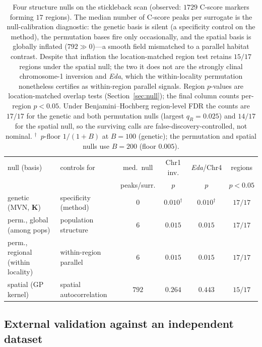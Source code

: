 \documentclass[11pt]{article}
\begin{document}
\begin{table}[h]
  \centering
  \small
  \begin{tabular}{llcccc}
    \hline
    null (basis) & controls for & med.\ null & Chr1 inv. & \textit{Eda}/Chr4 & regions \\
                 &              & peaks/surr. & $p$ & $p$ & $p<0.05$ \\
    \hline
    genetic (MVN, $\mathbf{K}$)        & specificity (method)     & $0$   & $0.010^{\dagger}$ & $0.010^{\dagger}$ & $17/17$ \\
    perm., global (among pops)         & population structure     & $6$   & $0.015$           & $0.015$           & $17/17$ \\
    perm., regional (within locality)  & within-region parallel   & $6$   & $0.015$           & $0.015$           & $17/17$ \\
    spatial (GP kernel)                & spatial autocorrelation  & $792$ & $0.264$           & $0.443$           & $15/17$ \\
    \hline
  \end{tabular}
  \caption{Four structure nulls on the stickleback scan (observed: $1729$ C-score
  markers forming $17$ regions). The median number of C-score peaks per surrogate is
  the null-calibration diagnostic: the genetic basis is silent (a specificity
  control on the method), the permutation bases fire only occasionally, and the
  spatial basis is globally inflated ($792 \gg 0$)---a smooth field mismatched to a
  parallel habitat contrast. Despite that inflation the location-matched region test
  retains $15/17$ regions under the spatial null; the two it does not are the
  strongly clinal chromosome-1 inversion and \textit{Eda}, which the within-locality
  permutation nonetheless certifies as within-region parallel signals. Region
  $p$-values are location-matched overlap tests (Section~\ref{sec:null}); the final
  column counts per-region $p < 0.05$. Under Benjamini--Hochberg region-level FDR the
  counts are $17/17$ for the genetic and both permutation nulls (largest
  $q_R = 0.025$) and $14/17$ for the spatial null, so the surviving calls are
  false-discovery-controlled, not nominal. $^{\dagger}$~$p$-floor $1/(1+B)$ at
  $B = 100$ (genetic); the permutation and spatial nulls use $B = 200$ (floor
  $0.005$).}
  \label{tab:threenull}
\end{table}

\subsection{External validation against an independent dataset}
\label{sec:kingman}
\end{document}
